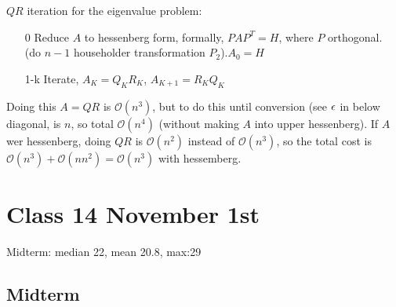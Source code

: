 $QR$ iteration for the eigenvalue problem:
\begin{enumerate}
\item[0] Reduce $A$ to hessenberg form, formally, $PAP^T = H$, where $P$
  orthogonal. (do $n-1$ householder transformation $P_2$).$A_0 = H$
\item[1-k] Iterate, $A_K = Q_KR_K$, $A_{K+1} = R_KQ_K$
\end{enumerate}
Doing this $A=QR$ is $\mathcal{O}(n^3)$, but to do this until
conversion (see $\epsilon$ in below diagonal, is $n$, so total
$\mathcal{O}(n^4)$ (without making $A$ into upper hessenberg).
If $A$ wer hessenberg, doing $QR$ is $\mathcal{O}(n^2)$ instead of
$\mathcal{O}(n^3)$, so the total cost is $\mathcal{O}(n^3) +
\mathcal{O}(nn^2) = \mathcal{O}(n^3)$ with hessemberg.

\pagebreak

\section{Class 14 November 1st}
\label{sec:class14}
Midterm: median 22, mean 20.8, max:29

\subsection{Midterm}

